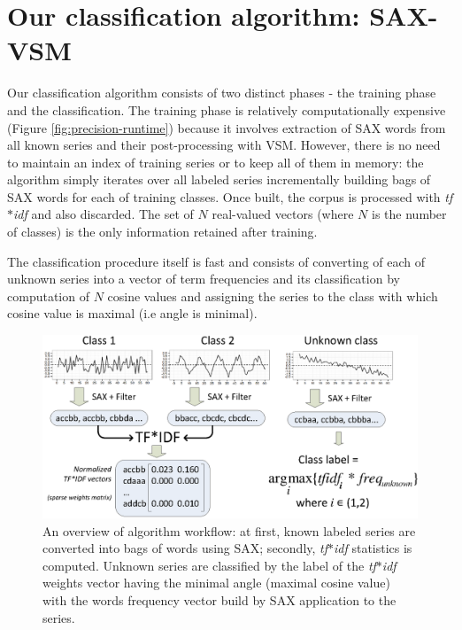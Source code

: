 \documentclass{llncs}
\begin{document}
\section{Our classification algorithm: SAX-VSM}
Our classification algorithm consists of two distinct phases - the training phase and the
classification. The training phase is relatively computationally expensive (Figure
\ref{fig:precision-runtime}) because it involves extraction of SAX words from all known series and
their post-processing with VSM. However, there is no need to maintain an index of training series or
to keep all of them in memory: the algorithm simply iterates over all labeled series incrementally
building bags of SAX words for each of training classes. Once built, the corpus is processed with
\textit{tf$\ast$idf} and also discarded. The set of $N$ real-valued vectors (where $N$ is the number
of classes) is the only information retained after training.

The classification procedure itself is fast and consists of converting of each of unknown series
into a vector of term frequencies and its classification by computation of $N$ cosine values
and assigning the series to the class with which cosine value is maximal (i.e angle is minimal).

\begin{figure}[H]
   \centering
   \includegraphics[width=120mm]{figures/overview.eps}
   \caption{An overview of algorithm workflow: at first, known labeled series are converted into
bags of words using SAX; secondly, \textit{tf$\ast$idf} statistics is computed. Unknown series are
classified by the label of the \textit{tf$\ast$idf} weights vector having the minimal angle (maximal
cosine value) with the words frequency vector build by SAX application to the series.}
   \label{fig:overview}
\end{figure}
\end{document}
